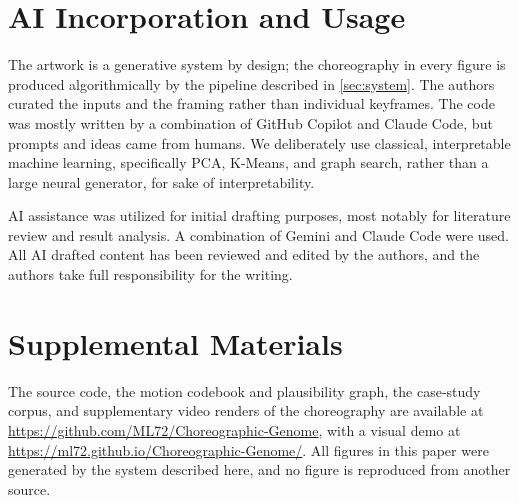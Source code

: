 \documentclass{vgtc}                          %
\begin{document}
\section{AI Incorporation and Usage}
The artwork is a generative system by design; the choreography in every figure is produced algorithmically by the pipeline described in \cref{sec:system}. The authors curated the inputs and the framing rather than
individual keyframes. The code was mostly written by a combination of GitHub Copilot and Claude Code, but prompts and ideas came from humans. We deliberately use classical, interpretable machine
learning, specifically PCA, K-Means, and graph search, rather than a large neural
generator, for sake of interpretability.

AI assistance was utilized for initial drafting purposes, most notably for literature review and result analysis. A combination of Gemini and Claude Code were used. All AI drafted content has been reviewed and edited by the authors, and the authors take full responsibility for the writing.

\section*{Supplemental Materials}
\label{sec:supplemental_materials}
The source code, the motion codebook and plausibility graph, the case-study
corpus, and supplementary video renders of the choreography are available at
\url{https://github.com/ML72/Choreographic-Genome}, with a visual demo at
\url{https://ml72.github.io/Choreographic-Genome/}. All figures in this paper were
generated by the system described here, and no figure is reproduced from another
source.




\end{document}
